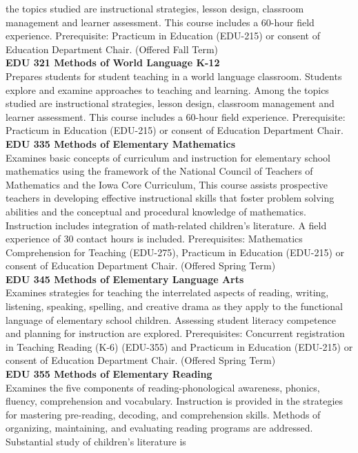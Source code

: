 \documentclass[
  letterpaper,
]{scrbook}
\begin{document}
the topics studied are instructional strategies, lesson design,
classroom management and learner assessment. This course includes a
60-hour field experience. Prerequisite: Practicum in Education (EDU-215)
or consent of Education Department Chair. (Offered Fall Term)\\
\textbf{EDU 321 Methods of World Language K-12}\\
Prepares students for student teaching in a world language classroom.
Students explore and examine approaches to teaching and learning. Among
the topics studied are instructional strategies, lesson design,
classroom management and learner assessment. This course includes a
60-hour field experience. Prerequisite: Practicum in Education (EDU-215)
or consent of Education Department Chair.\\
\textbf{EDU 335 Methods of Elementary Mathematics}\\
Examines basic concepts of curriculum and instruction for elementary
school mathematics using the framework of the National Council of
Teachers of Mathematics and the Iowa Core Curriculum, This course
assists prospective teachers in developing effective instructional
skills that foster problem solving abilities and the conceptual and
procedural knowledge of mathematics. Instruction includes integration of
math-related children's literature. A field experience of 30 contact
hours is included. Prerequisites: Mathematics Comprehension for Teaching
(EDU-275), Practicum in Education (EDU-215) or consent of Education
Department Chair. (Offered Spring Term)\\
\textbf{EDU 345 Methods of Elementary Language Arts}\\
Examines strategies for teaching the interrelated aspects of reading,
writing, listening, speaking, spelling, and creative drama as they apply
to the functional language of elementary school children. Assessing
student literacy competence and planning for instruction are explored.
Prerequisites: Concurrent registration in Teaching Reading (K-6)
(EDU-355) and Practicum in Education (EDU-215) or consent of Education
Department Chair. (Offered Spring Term)\\
\textbf{EDU 355 Methods of Elementary Reading}\\
Examines the five components of reading-phonological awareness, phonics,
fluency, comprehension and vocabulary. Instruction is provided in the
strategies for mastering pre-reading, decoding, and comprehension
skills. Methods of organizing, maintaining, and evaluating reading
programs are addressed. Substantial study of children's literature is
\end{document}

